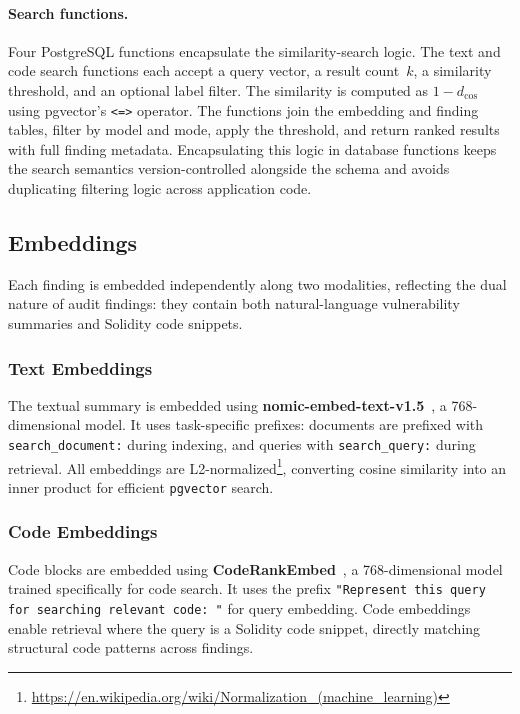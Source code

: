 \paragraph{Search functions.}
Four PostgreSQL functions encapsulate the similarity-search logic. The text and code search functions each accept a query vector, a result count~$k$, a similarity threshold, and an optional label filter. The similarity is computed as $1 - d_{\cos}$ using pgvector's \texttt{<=>} operator. The functions join the embedding and finding tables, filter by model and mode, apply the threshold, and return ranked results with full finding metadata. Encapsulating this logic in database functions keeps the search semantics version-controlled alongside the schema and avoids duplicating filtering logic across application code.

\subsection{Embeddings}
\label{subsec:indexing-embeddings}

Each finding is embedded independently along two modalities, reflecting the dual nature of audit findings: they contain both natural-language vulnerability summaries and Solidity code snippets.

\subsubsection*{Text Embeddings}
The textual summary is embedded using \textbf{nomic-embed-text-v1.5}~\cite{nussbaum2024nomic}, a 768-dimensional model. It uses task-specific prefixes: documents are prefixed with \texttt{search\_document:} during indexing, and queries with \texttt{search\_query:} during retrieval. All embeddings are L2-normalized\footnote{\url{https://en.wikipedia.org/wiki/Normalization_(machine_learning)}}, converting cosine similarity into an inner product for efficient \texttt{pgvector} search.

\subsubsection*{Code Embeddings}
Code blocks are embedded using \textbf{CodeRankEmbed}~\cite{suresh2025rank}, a 768-dimensional model trained specifically for code search. It uses the prefix \texttt{"Represent this query for searching relevant code: "} for query embedding. Code embeddings enable retrieval where the query is a Solidity code snippet, directly matching structural code patterns across findings.

